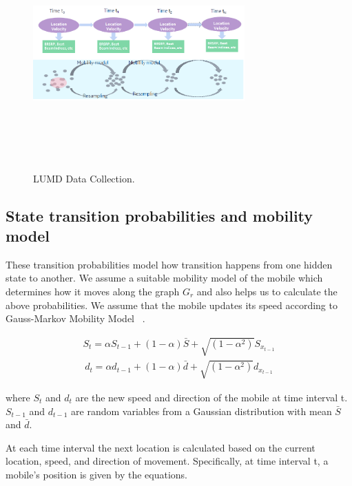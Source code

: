 \documentclass[conference, 10pt]{IEEEtran}
\begin{document}
\begin{figure}[t]
	\begin{center}
	\includegraphics[height=3.5in,width=3.2in]{./HMM_ParticleFilter_Illustration.png}
	\caption{\label{fig:hmm_particle}
	{\small LUMD Data Collection.}}
	\end{center}
	\end{figure}

\subsection{State transition probabilities and mobility model} 
\label{sec:statemodel}
These transition
probabilities model how transition happens from one hidden state
to another. 
We assume a suitable mobility model of the mobile which determines how it moves
along the graph $G_r$ and also helps us to calculate the above probabilities. We
assume that the mobile updates its speed according to Gauss-Markov Mobility Model ~\cite{Camp2002}.

\begin{align}
S_t = \alpha S_{t-1}+(1-\alpha)\bar{S}+\sqrt{(1-\alpha^2)}S_{x_{t-1}}
\label{eqn:speed}
\end{align}
\begin{align}
d_t = \alpha d_{t-1}+(1-\alpha)\bar{d}+\sqrt{(1-\alpha^2)}d_{x_{t-1}}
\label{eqn:speed}
\end{align}

 where $S_t$ and $d_t$ are the new speed and direction of the mobile at time interval t. $S_{t-1}$ and $d_{t-1}$
 are random variables from a Gaussian distribution with mean $\bar{S}$ and $\bar{d}$.
 
 At each time interval the next location is calculated based on the current location, speed, and direction of movement.
Specifically, at time interval t, a mobile's position is given by the equations.
\end{document}

